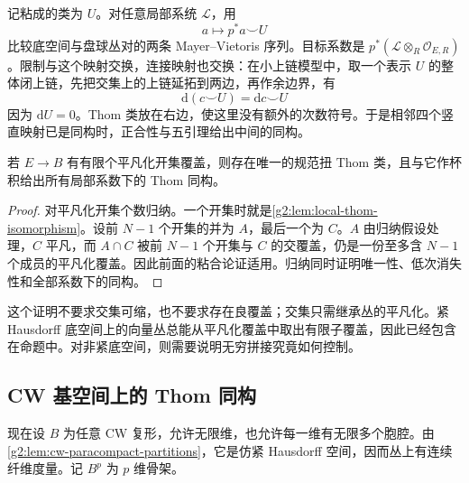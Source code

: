 记粘成的类为 \(U\)。对任意局部系统 \(\mathcal L\)，用
\[
	a\longmapsto p^*a\smile U
\]
比较底空间与盘球丛对的两条 Mayer--Vietoris 序列。目标系数是 \(p^*(\mathcal L\otimes_R\mathcal O_{E,R})\)。限制与这个映射交换，连接映射也交换：在小上链模型中，取一个表示 \(U\) 的整体闭上链，先把交集上的上链延拓到两边，再作余边界，有
\[
	\mathrm d(c\smile U)=\mathrm dc\smile U
\]
因为 \(\mathrm dU=0\)。Thom 类放在右边，使这里没有额外的次数符号。于是相邻四个竖直映射已是同构时，正合性与五引理给出中间的同构。

\begin{proposition}\label{g2:prop:finite-cover-thom}
	若 \(E\to B\) 有有限个平凡化开集覆盖，则存在唯一的规范扭 Thom 类，且与它作杯积给出所有局部系数下的 Thom 同构。
\end{proposition}
\begin{proof}
	对平凡化开集个数归纳。一个开集时就是\cref{g2:lem:local-thom-isomorphism}。设前 \(N-1\) 个开集的并为 \(A\)，最后一个为 \(C\)。\(A\) 由归纳假设处理，\(C\) 平凡，而 \(A\cap C\) 被前 \(N-1\) 个开集与 \(C\) 的交覆盖，仍是一份至多含 \(N-1\) 个成员的平凡化覆盖。因此前面的粘合论证适用。归纳同时证明唯一性、低次消失性和全部系数下的同构。
\end{proof}

这个证明不要求交集可缩，也不要求存在良覆盖；交集只需继承丛的平凡化。紧 Hausdorff 底空间上的向量丛总能从平凡化覆盖中取出有限子覆盖，因此已经包含在命题中。对非紧底空间，则需要说明无穷拼接究竟如何控制。

\subsection{CW 基空间上的 Thom 同构}
\label{g2:subsec:2002:03}
现在设 \(B\) 为任意 CW 复形，允许无限维，也允许每一维有无限多个胞腔。由\cref{g2:lem:cw-paracompact-partitions}，它是仿紧 Hausdorff 空间，因而丛上有连续纤维度量。记 \(B^p\) 为 \(p\) 维骨架。

